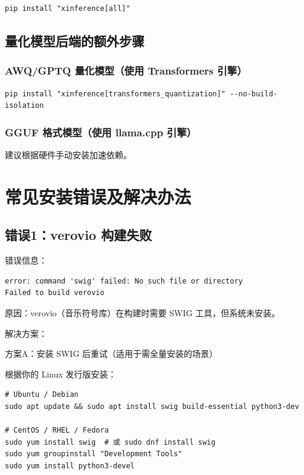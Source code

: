\documentclass[12pt,UTF8]{ctexbook}
\begin{document}
\begin{lstlisting}
pip install "xinference[all]"
\end{lstlisting}

\subsection{量化模型后端的额外步骤}

\subsubsection{AWQ/GPTQ 量化模型（使用 Transformers 引擎）}

\begin{lstlisting}
pip install "xinference[transformers_quantization]" --no-build-isolation
\end{lstlisting}

\subsubsection{GGUF 格式模型（使用 llama.cpp 引擎）}

建议根据硬件手动安装加速依赖。

\section{常见安装错误及解决办法}
\label{sec:installation_errors}

\subsection{错误1：verovio 构建失败}

错误信息：

\begin{lstlisting}
error: command 'swig' failed: No such file or directory
Failed to build verovio
\end{lstlisting}

原因：verovio（音乐符号库）在构建时需要 SWIG 工具，但系统未安装。

解决方案：

方案A：安装 SWIG 后重试（适用于需全量安装的场景）

根据你的 Linux 发行版安装：

\begin{lstlisting}
# Ubuntu / Debian
sudo apt update && sudo apt install swig build-essential python3-dev

# CentOS / RHEL / Fedora
sudo yum install swig  # 或 sudo dnf install swig
sudo yum groupinstall "Development Tools"
sudo yum install python3-devel
\end{lstlisting}
\end{document}
